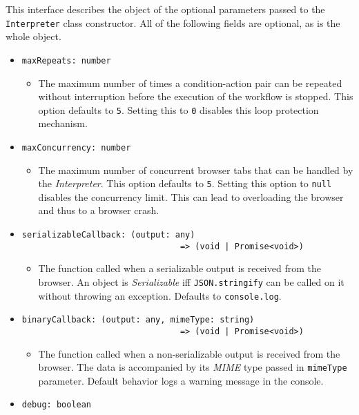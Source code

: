 This interface describes the object of the optional parameters passed to the \texttt{Interpreter} class constructor.
All of the following fields are optional, as is the whole object.
\begin{itemize}
   \item \texttt{maxRepeats: number} 
   \begin{itemize}
      \item The maximum number of times a condition-action pair can be repeated without interruption before the execution of the workflow is stopped.
      This option defaults to \texttt{5}. Setting this to \texttt{0} disables this loop protection mechanism.
   \end{itemize}
   \item \texttt{maxConcurrency: number}
   \begin{itemize}
      \item The maximum number of concurrent browser tabs that can be handled by the \textit{Interpreter}.
      This option defaults to \texttt{5}. Setting this option to \texttt{null} disables the concurrency limit. 
      This can lead to overloading the browser and thus to a browser crash.
   \end{itemize}
   \item \begin{verbatim}
serializableCallback: (output: any) 
                                => (void | Promise<void>)\end{verbatim}
   \begin{itemize}
      \item The function called when a serializable output is received from the browser.
      An object is \textit{Serializable} iff \texttt{JSON.stringify} can be called on it without throwing an exception.
      Defaults to \texttt{console.log}.
   \end{itemize}
   \item \begin{verbatim}
binaryCallback: (output: any, mimeType: string) 
                                => (void | Promise<void>)\end{verbatim}
   \begin{itemize}
      \item The function called when a non-serializable output is received from the browser.
      The data is accompanied by its \textit{MIME} type passed in \texttt{mimeType} parameter.
      Default behavior logs a warning message in the console.
   \end{itemize}
   \item \texttt{debug: boolean}

\end{itemize}
